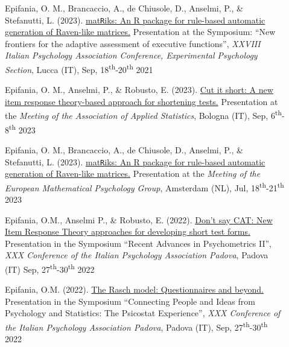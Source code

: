 \documentclass[letterpaper,12pt]{article}
\begin{document}
\begin{description}
		\item[] Epifania, O. M., Brancaccio, A., de Chiusole, D., Anselmi, P., \& Stefanutti, L. (2023). \href{https://ottaviae.github.io/presentations/AIP2023/Simposio-PRIN/AIP-2023-epifania-matRiks.pdf}{mat\texttt{R}iks: An R package for rule-based automatic generation of Raven-like matrices.} Presentation at the Symposium: ``New frontiers for the adaptive assessment of executive functions'',   \emph{XXVIII Italian Psychology Association Conference, Experimental Psychology Section}, Lucca (IT), Sep, 18\textsuperscript{th}-20\textsuperscript{th} 2021
	
		\item[] Epifania, O. M., Anselmi, P., \& Robusto, E. (2023). \href{https://ottaviae.github.io/presentations/Bologna2023/Cut-it-short.pdf}{Cut it short: A new item response theory-based approach for shortening tests.} Presentation at the \emph{Meeting of the Association of Applied Statistics},  Bologna (IT), Sep, 6\textsuperscript{th}-8\textsuperscript{th} 2023
	
	\item[] Epifania, O. M., Brancaccio, A., de Chiusole, D., Anselmi, P., \& Stefanutti, L. (2023). \href{https://ottaviae.github.io/presentations/empg2023/empg2023-Epifania.pdf}{mat\texttt{R}iks: An R package for rule-based automatic generation of Raven-like matrices.} Presentation at the \emph{Meeting of the European Mathematical Psychology Group},  Amsterdam (NL), Jul, 18\textsuperscript{th}-21\textsuperscript{th} 2023
	
	\item[] Epifania, O.M., Anselmi P., \& Robusto, E. (2022). \href{https://ottaviae.github.io/presentations/2022/aipIRT.pdf}{Don't say CAT: New Item Response Theory approaches for developing short test forms.} Presentation in the Symposium “Recent Advances in Psychometrics II”, \emph{XXX Conference of the Italian Psychology Association Padova}, Padova (IT) Sep, 27\textsuperscript{th}-30\textsuperscript{th} 2022
	
	\item[] Epifania, O.M. (2022). \href{https://ottaviae.github.io/presentations/2022/epifaniaRasch.pdf}{The Rasch model: Questionnaires and beyond.} Presentation in the Symposium “Connecting People and Ideas from Psychology and Statistics: The Psicostat Experience”, \emph{XXX Conference of the Italian Psychology Association Padova}, Padova (IT), Sep, 27\textsuperscript{th}-30\textsuperscript{th} 2022
	

\end{description}
\end{document}
